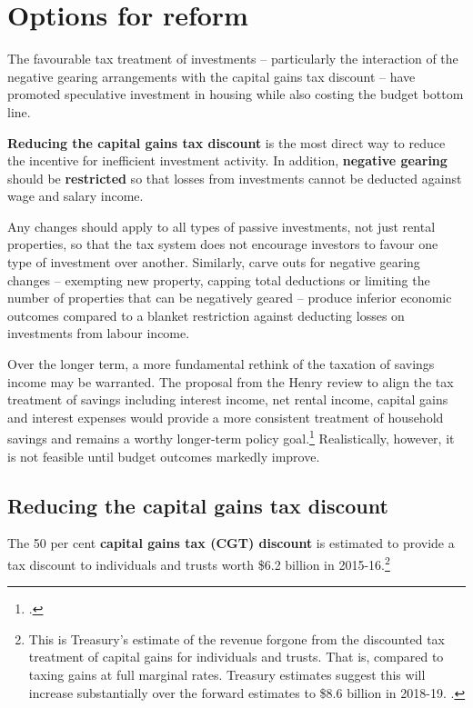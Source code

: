 \chapter{Options for reform}\label{chapter:options-for-reform}
The favourable tax treatment of investments -- particularly the interaction of the negative gearing arrangements with the capital gains tax discount -- have promoted speculative investment in housing while also costing the budget bottom line. 

\textbf{Reducing the capital gains tax discount} is the most direct way to reduce the incentive for inefficient investment activity. 
In addition, \textbf{negative gearing} should be \textbf{restricted} so that losses from investments cannot be deducted against wage and salary income. 

Any changes should apply to all types of passive investments, not just rental properties, so that the tax system does not encourage investors to favour one type of investment over another. 
Similarly, carve outs for negative gearing changes – exempting new property, capping total deductions or limiting the number of properties that can be negatively geared – produce inferior economic outcomes compared to a blanket restriction against deducting losses on investments from labour income.

Over the longer term, a more fundamental rethink of the taxation of savings income may be warranted. The proposal from the Henry review to align the tax treatment of savings including interest income, net rental income, capital gains and interest expenses would provide a more consistent treatment of household savings and remains a worthy longer-term policy goal.\footcite[][62--75]{HenryTaxReview2010} Realistically, however, it is not feasible until budget outcomes markedly improve.

\section{Reducing the capital gains tax discount}
The 50 per cent \textbf{capital gains tax (CGT) discount} is estimated to provide a tax discount to individuals and trusts worth \$6.2 billion in 2015-16.\footnote{This is Treasury’s estimate of the revenue forgone from the discounted tax treatment of capital gains for individuals and trusts. That is, compared to taxing gains at full marginal rates. Treasury estimates suggest this will increase substantially over the forward estimates to \$8.6 billion in 2018-19. \textcite[][4--21]{Treasury2016TES}.}   

